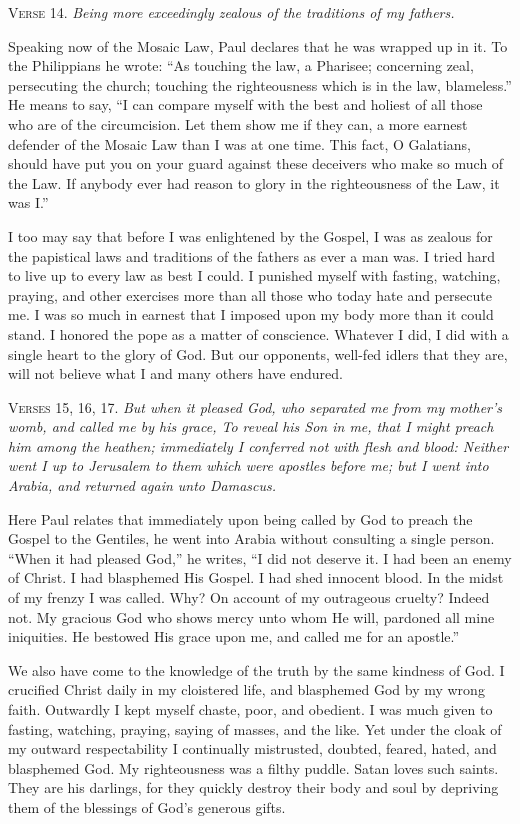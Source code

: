 \textsc{Verse} 14. \emph{Being more exceedingly zealous of the traditions of my fathers.}

Speaking now of the Mosaic Law, Paul declares that he was wrapped up in it. To the Philippians he wrote: “As touching the law, a Pharisee; concerning zeal, persecuting the church; touching the righteousness which is in the law, blameless.” He means to say, “I can compare myself with the best and holiest of all those who are of the circumcision. Let them show me if they can, a more earnest defender of the Mosaic Law than I was at one time. This fact, O Galatians, should have put you on your guard against these deceivers who make so much of the Law. If anybody ever had reason to glory in the righteousness of the Law, it was I.”

I too may say that before I was enlightened by the Gospel, I was as zealous for the papistical laws and traditions of the fathers as ever a man was. I tried hard to live up to every law as best I could. I punished myself with fasting, watching, praying, and other exercises more than all those who today hate and persecute me. I was so much in earnest that I imposed upon my body more than it could stand. I honored the pope as a matter of conscience. Whatever I did, I did with a single heart to the glory of God. But our opponents, well-fed idlers that they are, will not believe what I and many others have endured.

\textsc{Verses} 15, 16, 17. \emph{But when it pleased God, who separated me from my mother’s womb, and called me by his grace, To reveal his Son in me, that I might preach him among the heathen; immediately I conferred not with flesh and blood: Neither went I up to Jerusalem to them which were apostles before me; but I went into Arabia, and returned again unto Damascus.}

Here Paul relates that immediately upon being called by God to preach the Gospel to the Gentiles, he went into Arabia without consulting a single person. “When it had pleased God,” he writes, “I did not deserve it. I had been an enemy of Christ. I had blasphemed His Gospel. I had shed innocent blood. In the midst of my frenzy I was called. Why? On account of my outrageous cruelty? Indeed not. My gracious God who shows mercy unto whom He will, pardoned all mine iniquities. He bestowed His grace upon me, and called me for an apostle.”

We also have come to the knowledge of the truth by the same kindness of God. I crucified Christ daily in my cloistered life, and blasphemed God by my wrong faith. Outwardly I kept myself chaste, poor, and obedient. I was much given to fasting, watching, praying, saying of masses, and the like. Yet under the cloak of my outward respectability I continually mistrusted, doubted, feared, hated, and blasphemed God. My righteousness was a filthy puddle. Satan loves such saints. They are his darlings, for they quickly destroy their body and soul by depriving them of the blessings of God’s generous gifts.

